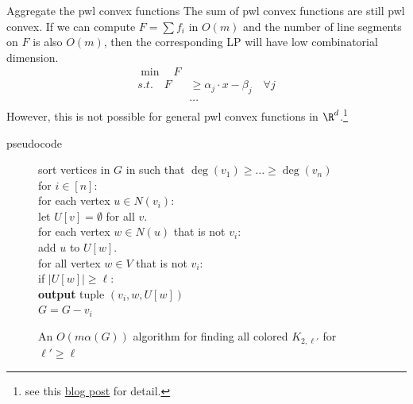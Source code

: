 \documentclass{beamer}
\begin{document}
\begin{frame}{Aggregate the pwl convex functions}
    The sum of pwl convex functions are still pwl convex. 
    \newline If we can compute $F=\sum f_i$ in $O(m)$ and the number of line segments on $F$ is also $O(m)$, then the corresponding LP will have low combinatorial dimension.
    \begin{align*}
        \min \quad F\\
        s.t. \quad F&\geq \alpha_j\cdot x -\beta_j \quad \forall j\\
        &\cdots
    \end{align*}
    However, this is not possible for general pwl convex functions in $\R^d$.\footnote{see this \href{https://talldoor.uk/posts/2024-09-16-piecewise-linear.html}{blog post} for detail.}
\end{frame}
\begin{frame}{pseudocode}
    \begin{figure}[h!]
        \begin{algo}
            sort vertices in $G$ in such that $\deg(v_1)\geq \dots \geq \deg(v_n)$\\
            for $i\in[n]$:\\ 
            \quad for each vertex $u\in N(v_i)$:\\
            \quad \quad let $U[v]=\emptyset$ for all $v$.\\
            \quad \quad for each vertex $w\in N(u)$ that is not $v_i$:\\
            \quad \quad \quad add $u$ to $U[w]$.\\
            \quad for all vertex $w\in V$ that is not $v_i$:\\
            \quad \quad if $|U[w]|\geq \ell$:\\ \quad 
            \quad \quad \textbf{output} tuple $(v_i,w,U[w])$\\
            \quad $G=G-v_i$
        \end{algo}
        \caption{An $O(m\alpha(G))$ algorithm for finding all colored $K_{2,\ell'}$ for $\ell' \geq \ell$}
        \label{figalg:malpha}
    \end{figure}
\end{frame}
\end{document}
